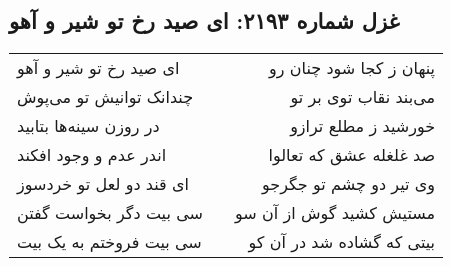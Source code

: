 \begin{center}
\section*{غزل شماره ۲۱۹۳: ای صید رخ تو شیر و آهو}
\label{sec:2193}
\begin{longtable}{l p{0.5cm} r}
ای صید رخ تو شیر و آهو
&&
پنهان ز کجا شود چنان رو
\\
چندانک توانیش تو می‌پوش
&&
می‌بند نقاب توی بر تو
\\
در روزن سینه‌ها بتابید
&&
خورشید ز مطلع ترازو
\\
اندر عدم و وجود افکند
&&
صد غلغله عشق که تعالوا
\\
ای قند دو لعل تو خردسوز
&&
وی تیر دو چشم تو جگرجو
\\
سی بیت دگر بخواست گفتن
&&
مستیش کشید گوش از آن سو
\\
سی بیت فروختم به یک بیت
&&
بیتی که گشاده شد در آن کو
\\
\end{longtable}
\end{center}
